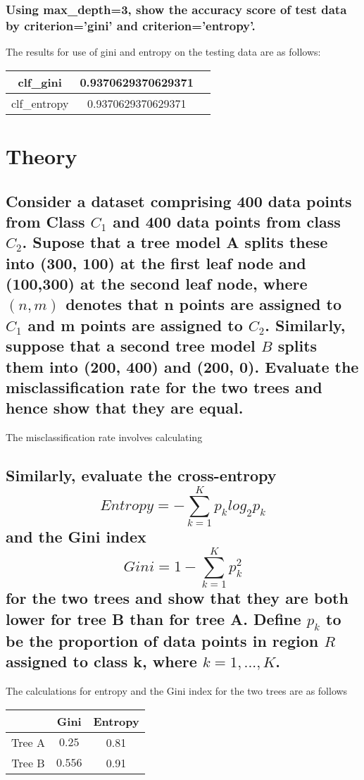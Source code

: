 \documentclass{article}
\begin{document}
		\subsubsection{Using max\_depth=3, show the accuracy score of test data by criterion='gini' 
						and criterion='entropy'.}
				The results for use of gini and entropy on the testing data are as follows:
				\begin{center}
						\begin{tabular}{|c |c |c |}
							\hline
							clf\_gini & 0.9370629370629371\\\hline	
							clf\_entropy & 0.9370629370629371\\\hline
						\end{tabular}
				\end{center}
\section{Theory}
	\subsection{Consider a dataset comprising 400 data points from Class $C_{1}$ and 400 data points 
		from class $C_{2}$. Supose that a tree model A splits these into (300, 100) at the first leaf
		node and (100,300) at the second leaf node, where $(n,m)$ denotes that n points are assigned 
		to $C_{1}$ and m points are assigned to $C_{2}$. Similarly, suppose that a second tree model $B$
		splits them into (200, 400) and (200, 0). Evaluate the misclassification rate for the two trees
		and hence show that they are equal.}
		
		The misclassification rate involves calculating 
	\subsection{Similarly, evaluate the cross-entropy 
		\[ Entropy = - \sum_{k = 1}^{K}p_{k}log_{2}p_{k}\]
		and the Gini index
		\[ Gini = 1 - \sum_{k = 1}^{K}p^{2}_{k}\]
		for the two trees and show that they are both lower for tree B than for tree A. Define $p_{k}$
		to be the proportion of data points in region $R$ assigned to class k, where $k = 1,...,K$.
		}
		The calculations for entropy and the Gini index for the two trees are as follows

		\begin{center}
		\begin{tabular}{|c | c | c |}
			\hline
			 & Gini & Entropy\\\hline
			Tree A & $0.25$ & 0.81\\\hline
			Tree B & $0.556$ & 0.91 \\

		\end{tabular}
		\end{center}
\end{document}
